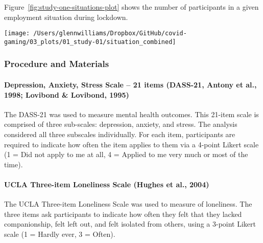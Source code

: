 \documentclass[
  english,
  man,floatsintext]{apa6}
\let\oldparagraph\paragraph
\renewcommand{\paragraph}[1]{\oldparagraph{#1}\mbox{}}
\begin{document}
Figure~\ref{fig:study-one-situations-plot} shows the number of participants in a given employment situation during lockdown.

\begin{figure*}[!htbp]

{\centering \texttt{[image: /Users/glennwilliams/Dropbox/GitHub/covid-gaming/03\_plots/01\_study-01/situation\_combined]} 

}

\caption{Count of participants by self-reported (a) employment status, (b) lockdown work situation, and (c) living situation.}\label{fig:study-one-situations-plot}
\end{figure*}

\hypertarget{procedure-and-materials}{%
\subsubsection{Procedure and Materials}\label{procedure-and-materials}}

\hypertarget{depression-anxiety-stress-scale-21-items-dass-21-antony-et-al.-1998-lovibond-lovibond-1995}{%
\paragraph{Depression, Anxiety, Stress Scale -- 21 items (DASS-21, Antony et al., 1998; Lovibond \& Lovibond, 1995)}\label{depression-anxiety-stress-scale-21-items-dass-21-antony-et-al.-1998-lovibond-lovibond-1995}}

The DASS-21 was used to measure mental health outcomes. This 21-item scale is comprised of three sub-scales: depression, anxiety, and stress. The analysis considered all three subscales individually. For each item, participants are required to indicate how often the item applies to them via a 4-point Likert scale (1 = Did not apply to me at all, 4 = Applied to me very much or most of the time).

\hypertarget{ucla-three-item-loneliness-scale-hughes-et-al.-2004}{%
\paragraph{UCLA Three-item Loneliness Scale (Hughes et al., 2004)}\label{ucla-three-item-loneliness-scale-hughes-et-al.-2004}}

The UCLA Three-item Loneliness Scale was used to measure of loneliness. The three items ask participants to indicate how often they felt that they lacked companionship, felt left out, and felt isolated from others, using a 3-point Likert scale (1 = Hardly ever, 3 = Often).
\end{document}
